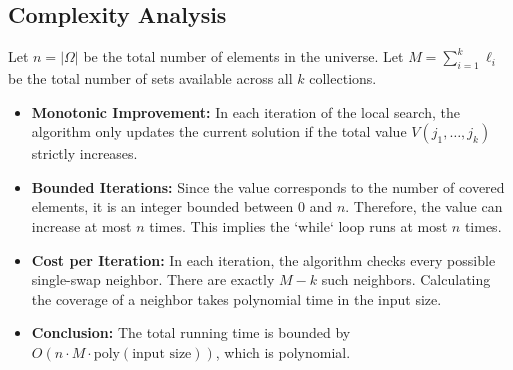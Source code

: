 \subsection*{Complexity Analysis}

Let $n = |\Omega|$ be the total number of elements in the universe.
Let $M = \sum_{i=1}^k \ell_i$ be the total number of sets available across all $k$ collections.

\begin{itemize}
    \item \textbf{Monotonic Improvement:} In each iteration of the local search, the algorithm only updates the current solution if the total value $V(j_1, \dots, j_k)$ strictly increases.
    \item \textbf{Bounded Iterations:} Since the value corresponds to the number of covered elements, it is an integer bounded between $0$ and $n$. Therefore, the value can increase at most $n$ times. This implies the `while` loop runs at most $n$ times.
    \item \textbf{Cost per Iteration:} In each iteration, the algorithm checks every possible single-swap neighbor. There are exactly $M - k$ such neighbors. Calculating the coverage of a neighbor takes polynomial time in the input size.
    \item \textbf{Conclusion:} The total running time is bounded by $O(n \cdot M \cdot \text{poly}(\text{input size}))$, which is polynomial.
\end{itemize}
